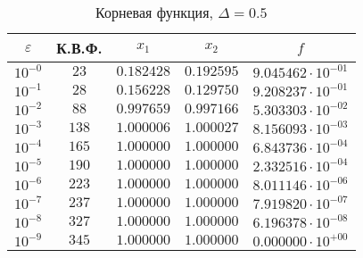 \documentclass[a4paper,12pt,notitlepage,pdftex,headsepline]{scrartcl}
\begin{document}
        \begin{table}[ht]
          \centering
          \caption{Корневая функция, $\Delta = 0.5$}
          \begin{tabular}{|c|c|c|c|c|}
            \hline
            $\varepsilon$ & К.В.Ф. & $x_1$ & $x_2$ & $f$\\
            \hline
            $10^{-0}$ & $23$ & $0.182428$ & $0.192595$ & $9.045462\cdot 10^{-01}$\\
            $10^{-1}$ & $28$ & $0.156228$ & $0.129750$ & $9.208237\cdot 10^{-01}$\\
            $10^{-2}$ & $88$ & $0.997659$ & $0.997166$ & $5.303303\cdot 10^{-02}$\\
            $10^{-3}$ & $138$ & $1.000006$ & $1.000027$ & $8.156093\cdot 10^{-03}$\\
            $10^{-4}$ & $165$ & $1.000000$ & $1.000000$ & $6.843736\cdot 10^{-04}$\\
            $10^{-5}$ & $190$ & $1.000000$ & $1.000000$ & $2.332516\cdot 10^{-04}$\\
            $10^{-6}$ & $223$ & $1.000000$ & $1.000000$ & $8.011146\cdot 10^{-06}$\\
            $10^{-7}$ & $237$ & $1.000000$ & $1.000000$ & $7.919820\cdot 10^{-07}$\\
            $10^{-8}$ & $327$ & $1.000000$ & $1.000000$ & $6.196378\cdot 10^{-08}$\\
            $10^{-9}$ & $345$ & $1.000000$ & $1.000000$ & $0.000000\cdot 10^{+00}$\\
            \hline
          \end{tabular}
        \end{table}
\end{document}
